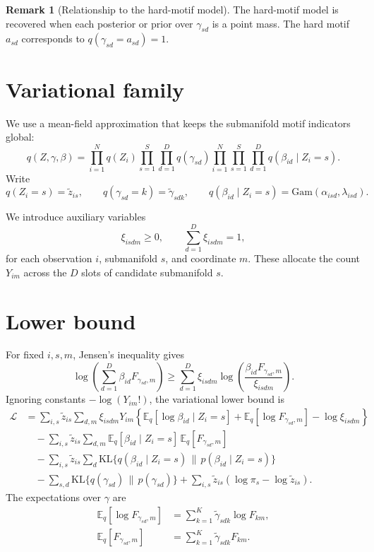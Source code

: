 \documentclass[11pt]{article}
\newcommand{\Gam}{\mathrm{Gam}}
\newcommand{\KL}{\mathrm{KL}}
\newcommand{\E}{\mathbb{E}}
\newcommand{\tg}{\widetilde{\gamma}}
\newcommand{\tz}{\widetilde{z}}
\theoremstyle{definition}
\newtheorem{remark}{Remark}
\begin{document}
\begin{remark}[Relationship to the hard-motif model]
The hard-motif model is recovered when each posterior or prior over
$\gamma_{sd}$ is a point mass. The hard motif $a_{sd}$ corresponds to
$q(\gamma_{sd}=a_{sd})=1$.
\end{remark}

\section{Variational family}

We use a mean-field approximation that keeps the submanifold motif indicators
global:
\[
  q(Z,\gamma,\beta)
  =
  \prod_{i=1}^{N} q(Z_i)
  \prod_{s=1}^{S}\prod_{d=1}^{D} q(\gamma_{sd})
  \prod_{i=1}^{N}\prod_{s=1}^{S}\prod_{d=1}^{D}
    q(\beta_{id}\mid Z_i=s).
\]
Write
\[
  q(Z_i=s)=\tz_{is},
  \qquad
  q(\gamma_{sd}=k)=\tg_{sdk},
  \qquad
  q(\beta_{id}\mid Z_i=s)=\Gam(\alpha_{isd},\lambda_{isd}).
\]

We introduce auxiliary variables
\[
  \xi_{isdm}\geq 0,
  \qquad
  \sum_{d=1}^{D}\xi_{isdm}=1,
\]
for each observation $i$, submanifold $s$, and coordinate $m$. These allocate
the count $Y_{im}$ across the $D$ slots of candidate submanifold $s$.

\section{Lower bound}

For fixed $i,s,m$, Jensen's inequality gives
\[
  \log\left(\sum_{d=1}^{D}\beta_{id}F_{\gamma_{sd},m}\right)
  \geq
  \sum_{d=1}^{D}
  \xi_{isdm}
  \log\left(
    \frac{\beta_{id}F_{\gamma_{sd},m}}{\xi_{isdm}}
  \right).
\]
Ignoring constants $-\log(Y_{im}!)$, the variational lower bound is
\begin{align}
  \mathcal{L}
  &=
  \sum_{i,s}\tz_{is}
  \sum_{d,m}
  \xi_{isdm}Y_{im}
  \left\{
    \E_q[\log \beta_{id}\mid Z_i=s]
    +
    \E_q[\log F_{\gamma_{sd},m}]
    -
    \log \xi_{isdm}
  \right\} \nonumber \\
  &\quad
  -
  \sum_{i,s}\tz_{is}
  \sum_{d,m}
  \E_q[\beta_{id}\mid Z_i=s]\,
  \E_q[F_{\gamma_{sd},m}]
  \nonumber \\
  &\quad
  -
  \sum_{i,s}\tz_{is}\sum_d
  \KL\{q(\beta_{id}\mid Z_i=s)\,\|\,p(\beta_{id}\mid Z_i=s)\}
  \nonumber \\
  &\quad
  -
  \sum_{s,d}
  \KL\{q(\gamma_{sd})\,\|\,p(\gamma_{sd})\}
  +
  \sum_{i,s}\tz_{is}(\log \pi_s-\log \tz_{is}).
  \label{eq:soft-mos-elbo}
\end{align}
The expectations over $\gamma$ are
\begin{align}
  \E_q[\log F_{\gamma_{sd},m}]
    &= \sum_{k=1}^{K}\tg_{sdk}\log F_{km}, \\
  \E_q[F_{\gamma_{sd},m}]
    &= \sum_{k=1}^{K}\tg_{sdk}F_{km}.
\end{align}
\end{document}
